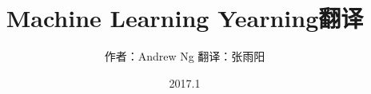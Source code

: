 \documentclass[a4paper,12pt]{book}
\begin{document}
\author{作者：Andrew Ng  翻译：张雨阳}
\title{Machine Learning Yearning翻译}
\date{2017.1}


\frontmatter
\maketitle
\tableofcontents
\mainmatter




%
%

\backmatter
\end{document}
